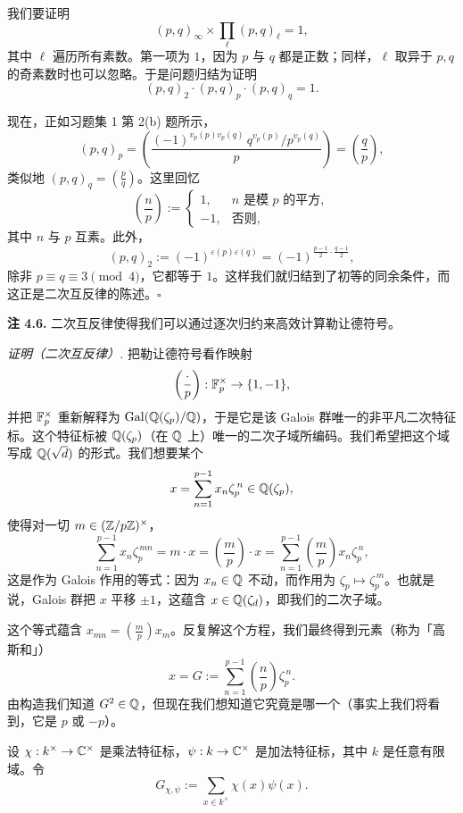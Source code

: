我们要证明
\[
(p,q)_{\infty}\times\prod_{\ell}(p,q)_{\ell}=1,
\]
其中 $\ell$ 遍历所有素数。第一项为 $1$，因为 $p$ 与 $q$ 都是正数；同样，$\ell$ 取异于 $p,q$ 的奇素数时也可以忽略。于是问题归结为证明
\[
(p,q)_2\cdot (p,q)_p\cdot (p,q)_q=1 .
\]

现在，正如习题集 1 第 2(b) 题所示，
\[
(p,q)_p=\left(\frac{(-1)^{v_p(p)v_p(q)}\,q^{v_p(p)}\big/p^{v_p(q)}}{p}\right)=\left(\frac{q}{p}\right),
\]
类似地 $(p,q)_q=\left(\frac{p}{q}\right)$。这里回忆
\[
\left(\frac{n}{p}\right):=\begin{cases} 1, & n \text{ 是模 } p \text{ 的平方},\\ -1, & \text{否则},\end{cases}
\]
其中 $n$ 与 $p$ 互素。此外，
\[
(p,q)_2:=(-1)^{\varepsilon(p)\varepsilon(q)}=(-1)^{\frac{p-1}{2}\cdot\frac{q-1}{2}},
\]
除非 $p\equiv q\equiv 3 \pmod 4$，它都等于 $1$。这样我们就归结到了初等的同余条件，而这正是二次互反律的陈述。\hfill$\square$

\textbf{注 4.6.} 二次互反律使得我们可以通过逐次归约来高效计算勒让德符号。

\textit{证明（二次互反律）.} 把勒让德符号看作映射
\[
\left(\frac{\cdot}{p}\right):\mathbb{F}^{\times}_p\to\{1,-1\},
\]
并把 $\mathbb{F}^{\times}_p$ 重新解释为 $\operatorname{Gal}(\mathbb{Q}(\zeta_p)/\mathbb{Q})$，于是它是该 Galois 群唯一的非平凡二次特征标。这个特征标被 $\mathbb{Q}(\zeta_p)$（在 $\mathbb{Q}$ 上）唯一的二次子域所编码。我们希望把这个域写成 $\mathbb{Q}(\sqrt{d})$ 的形式。我们想要某个
\[
x=\sum_{n=1}^{p-1}x_n\zeta_p^{\,n}\in\mathbb{Q}(\zeta_p),
\]
使得对一切 $m\in(\mathbb{Z}/p\mathbb{Z})^{\times}$，
\[
\sum_{n=1}^{p-1}x_n\zeta_p^{\,mn}=m\cdot x=\left(\frac{m}{p}\right)\cdot x=\sum_{n=1}^{p-1}\left(\frac{m}{p}\right)x_n\zeta_p^{\,n},
\]
这是作为 Galois 作用的等式：因为 $x_n\in\mathbb{Q}$ 不动，而作用为 $\zeta_p\mapsto\zeta_p^{\,m}$。也就是说，Galois 群把 $x$ 平移 $\pm 1$，这蕴含 $x\in\mathbb{Q}(\zeta_d)$，即我们的二次子域。

这个等式蕴含 $x_{mn}=\left(\frac{m}{p}\right)x_m$。反复解这个方程，我们最终得到元素（称为「高斯和」）
\[
x=G:=\sum_{n=1}^{p-1}\left(\frac{n}{p}\right)\zeta_p^{\,n}.
\]
由构造我们知道 $G^2\in\mathbb{Q}$，但现在我们想知道它究竟是哪一个（事实上我们将看到，它是 $p$ 或 $-p$）。

设 $\chi:k^{\times}\to\mathbb{C}^{\times}$ 是乘法特征标，$\psi:k\to\mathbb{C}^{\times}$ 是加法特征标，其中 $k$ 是任意有限域。令
\[
G_{\chi,\psi}:=\sum_{x\in k^{\times}}\chi(x)\psi(x).
\]

